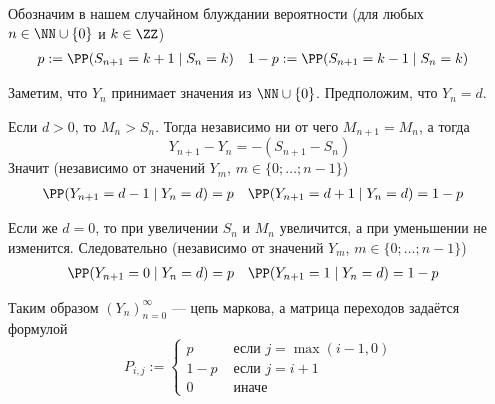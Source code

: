 \documentclass[12pt,a4paper]{article}
\begin{document}
    \begin{enumproblem}
        Обозначим в нашем случайном блуждании вероятности (для любых $n \in \NN \cup \{0\}$ и $k \in \ZZ$)
        \begin{align*}
            &p := \PP(S_{n+1} = k+1 \mid S_n = k)&
            &1-p := \PP(S_{n+1} = k-1 \mid S_n = k)
        \end{align*}

        Заметим, что $Y_n$ принимает значения из $\NN \cup \{0\}$. Предположим, что $Y_n = d$.
        
        Если $d > 0$, то $M_n > S_n$. Тогда независимо ни от чего $M_{n+1} = M_n$, а тогда
        \[Y_{n+1} - Y_n = -(S_{n+1} - S_n)\]
        Значит (независимо от значений $Y_m$, $m \in \{0; \dots; n-1\}$)
        \begin{align*}
            &\PP(Y_{n+1} = d-1 \mid Y_n = d) = p&
            &\PP(Y_{n+1} = d+1 \mid Y_n = d) = 1-p
        \end{align*}

        Если же $d = 0$, то при увеличении $S_n$ и $M_n$ увеличится, а при уменьшении не изменится. Следовательно (независимо от значений $Y_m$, $m \in \{0; \dots; n-1\}$)
        \begin{align*}
            &\PP(Y_{n+1} = 0 \mid Y_n = d) = p&
            &\PP(Y_{n+1} = 1 \mid Y_n = d) = 1-p
        \end{align*}

        Таким образом $(Y_n)_{n=0}^\infty$ --- цепь маркова, а матрица переходов задаётся формулой
        \[
            P_{i, j} :=
            \begin{cases}
                p& \text{ если $j = \max(i-1, 0)$}\\
                1-p& \text{ если $j = i+1$}\\
                0& \text{ иначе}
            \end{cases}
        \]
    \end{enumproblem}
\end{document}
